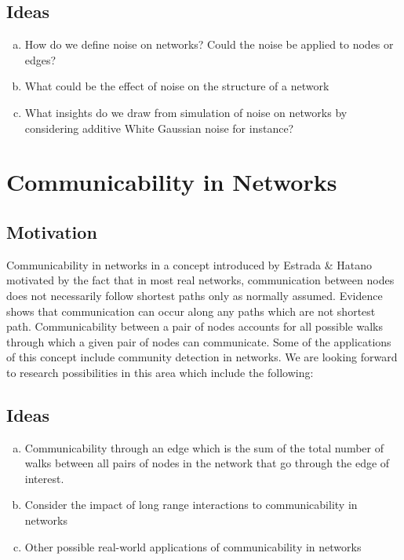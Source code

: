 \documentclass[10pt,a4paper]{article}
\begin{document}
	\subsection{Ideas}
	\begin{enumerate}[a)]
		\item How do we define noise on networks? Could the noise be applied to nodes or edges? 
		\item What could be the effect of noise on the structure of a network
		\item What insights do we draw from simulation of noise on networks by considering additive White Gaussian noise for instance?
	\end{enumerate}
	
	\section{Communicability in Networks}
	\subsection{Motivation}
	Communicability in networks in a concept introduced by Estrada \& Hatano \citep{estrada2008communicability} motivated by the fact that in most real networks, communication between nodes does not necessarily follow shortest paths only as normally assumed. Evidence shows that communication can occur along any paths which are not shortest path. Communicability between a pair of nodes accounts for all possible walks through which a given pair of nodes can communicate. Some of the applications of this concept include community detection in networks. We are looking forward to research possibilities in this area which include the following: 
	\subsection{Ideas}
	\begin{enumerate}[a)]
		\item Communicability through an edge which is the sum of the total number of walks between all pairs of nodes in the network that go through the edge of interest.
		\item Consider the impact of long range interactions to communicability in networks
		\item Other possible real-world applications of communicability in networks
	\end{enumerate}
	
	
	
\end{document}
